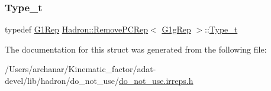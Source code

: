 \mbox{\label{structHadron_1_1RemovePCRep_3_01G1gRep_01_4_abf2b92413572b161f78c06e6bfd31f11}} 
\subsubsection{\texorpdfstring{Type\_t}{Type\_t}\hspace{0.1cm}{\footnotesize\ttfamily [2/2]}}
{\footnotesize\ttfamily typedef \mbox{\hyperlink{structHadron_1_1G1Rep}{G1\+Rep}} \mbox{\hyperlink{structHadron_1_1RemovePCRep}{Hadron\+::\+Remove\+P\+C\+Rep}}$<$ \mbox{\hyperlink{structHadron_1_1G1gRep}{G1g\+Rep}} $>$\+::\mbox{\hyperlink{structHadron_1_1RemovePCRep_3_01G1gRep_01_4_abf2b92413572b161f78c06e6bfd31f11}{Type\+\_\+t}}}



The documentation for this struct was generated from the following file\+:\begin{DoxyCompactItemize}
\item 
/\+Users/archanar/\+Kinematic\+\_\+factor/adat-\/devel/lib/hadron/do\+\_\+not\+\_\+use/\mbox{\hyperlink{adat-devel_2lib_2hadron_2do__not__use_2do__not__use_8irreps_8h}{do\+\_\+not\+\_\+use.\+irreps.\+h}}\end{DoxyCompactItemize}
